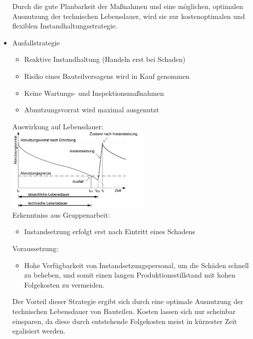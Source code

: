 \documentclass[fleqn,twoside,dvipsnames]{article}
\begin{document}
\begin{itemize}
\begin{itemize}
                    \end{itemize}
                Durch die gute Planbarkeit der Maßnahmen und eine möglichen, optimalen Ausnutzung der technischen Lebensdauer, wird sie zur kostenoptimalen und flexiblen Instandhaltungsstrategie.
            \item Ausfallstrategie
                \begin{itemize}
                    \item Reaktive Instandhaltung (Handeln erst bei Schaden)
                    \item Risiko eines Bauteilversagens wird in Kauf genommen
                    \item Keine Wartungs- und Inspektionsmaßnahmen
                    \item Abnutzungsvorrat wird maximal ausgenutzt
                \end{itemize}
                Auswirkung auf Lebensdauer:\\
                \includegraphics[width=0.55\textwidth]{Grafiken/Instandhaltung/Ausfallstrategie.png}\\
                Erkenntniss aus Gruppenarbeit:
                    \begin{itemize}
                        \item Instandsetzung erfolgt erst nach Eintritt eines Schadens
                    \end{itemize}
                Voraussetzung:
                    \begin{itemize}
                        \item Hohe Verfügbarkeit von Instandsetzungspersonal, um die Schäden schnell zu beheben, und somit einen langen Produktionsstillstand mit hohen Folgekosten zu vermeiden.
                    \end{itemize}
                Der Vorteil dieser Strategie ergibt sich durch eine optimale Ausnutzung der technischen Lebensdauer von Bauteilen. Kosten lassen sich nur scheinbar einsparen, da diese durch entstehende Folgekosten meist in kürzester Zeit egalisiert werden.
        \end{itemize}
\newpage
\end{document}
